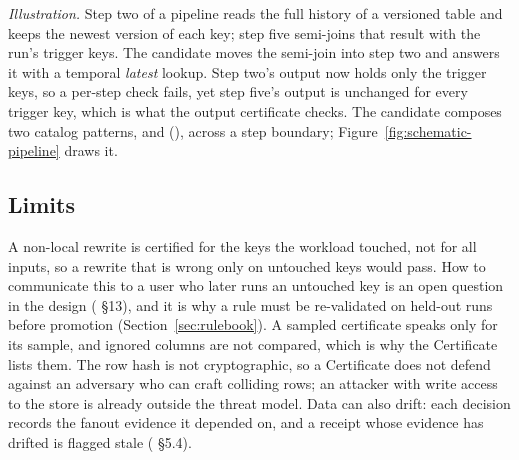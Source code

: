 \emph{Illustration.} Step two of a pipeline reads the full history of a
versioned table and keeps the newest version of each key; step five semi-joins
that result with the run's trigger keys. The candidate moves the semi-join into
step two and answers it with a temporal \emph{latest} lookup. Step two's output
now holds only the trigger keys, so a per-step check fails, yet step five's
output is unchanged for every trigger key, which is what the output certificate
checks. The candidate composes two catalog patterns,
 and 
(), across a step boundary;
Figure~\ref{fig:schematic-pipeline} draws it.

\subsection{Limits}\label{sec:certlimits}

A non-local rewrite is certified for the keys the workload touched, not for all
inputs, so a rewrite that is wrong only on untouched keys would pass. How to
communicate this to a user who later runs an untouched key is an open question
in the design ( \S13), and it is why a rule must be re-validated
on held-out runs before promotion (Section~\ref{sec:rulebook}). A sampled
certificate speaks only for its sample, and ignored columns are not compared,
which is why the Certificate lists them. The row hash is not cryptographic, so a
Certificate does not defend against an adversary who can craft colliding rows;
an attacker with write access to the store is already outside the threat model.
Data can also drift: each decision records the fanout evidence it depended on,
and a receipt whose evidence has drifted is flagged stale (
\S5.4).
